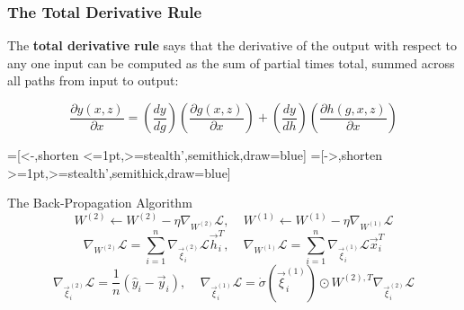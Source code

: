 \documentclass{beamer}
\begin{document}
\begin{frame}
  \frametitle{The Total Derivative Rule}

  The {\bf total derivative rule} says that the derivative of the
  output with respect to any one input can be computed as the sum of
  partial times total, summed across all paths from input to output:

  \begin{displaymath}
    \frac{\partial y(x,z)}{\partial x} =
    \left(\frac{d y}{d g}\right)\left(\frac{\partial g(x,z)}{\partial x}\right) +
    \left(\frac{d y}{d h}\right)\left(\frac{\partial h(g,x,z)}{\partial x}\right)
  \end{displaymath}

  \begin{center}
    =[<-,shorten <=1pt,>=stealth',semithick,draw=blue]
    =[->,shorten >=1pt,>=stealth',semithick,draw=blue]
  \end{center}
\end{frame}

\begin{frame}
  \begin{block}{The Back-Propagation Algorithm}
    \[
    W^{(2)}\leftarrow W^{(2)}-\eta\nabla_{W^{(2)}}{\mathcal L},~~~~~
    W^{(1)}\leftarrow W^{(1)}-\eta\nabla_{W^{(1)}}{\mathcal L}
    \]
    \[
    \nabla_{W^{(2)}}{\mathcal L}=\sum_{i=1}^n \nabla_{\vec\xi_i^{(2)}}{\mathcal L}
    \vec{h}_i^T,~~~~~
    \nabla_{W^{(1)}}{\mathcal L}=\sum_{i=1}^n\nabla_{\vec\xi_i^{(1)}}{\mathcal L}
    \vec{x}_i^T
    \]
    \[
    \nabla_{\vec\xi_i^{(2)}}{\mathcal L}=\frac{1}{n} (\hat{y}_{i}-\vec{y}_{i}),~~~~~
    \nabla_{\vec\xi_i^{(1)}}{\mathcal L}=\dot\sigma(\vec\xi_{i}^{(1)})\odot
    W^{(2),T}\nabla_{\vec\xi_i^{(2)}}{\mathcal L}
    \]
  \end{block}
\end{frame}
\end{document}

